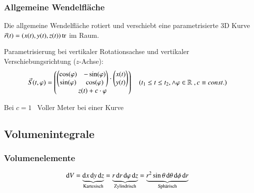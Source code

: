 

\subsubsection{Allgemeine Wendelfläche}
Die allgemeine Wendelfläche rotiert und verschiebt eine parametrisierte 3D Kurve $\vec{r}(t) = (x(t), y(t), z(t))\operatorname{tr}$ im Raum.

Parametrisierung bei vertikaler Rotationsachse und vertikaler Verschiebungsrichtung ($z$-Achse):
\[
    \vec{S}(t, \varphi) = \begin{pmatrix}
        \begin{pmatrix}
            \cos(\varphi) & -\sin(\varphi)\\
            \sin(\varphi) & \cos(\varphi)
        \end{pmatrix}
        \cdot \begin{pmatrix}
            x(t)\\
            y(t)
        \end{pmatrix}\\
        z(t) + c \cdot \varphi
    \end{pmatrix}
    \quad (t_1 \leq t \leq t_2, \land \varphi \in \mathbb{R}\;, c \equiv const.)
\]

Bei $c = 1$ \textrightarrow\ Voller Meter bei einer Kurve %



\subsection{Volumenintegrale}
\subsubsection{Volumenelemente}
$$ 
 \diff V 
    = \underbrace{\diff x \diff y \diff z}_{\text{Kartesisch}}
    = \underbrace{r \diff r \diff \varphi \diff z}_{\text{Zylindrisch}}
    = \underbrace{r^2 \sin \theta \diff \theta \diff \phi \diff r}_{\text{Sphärisch}}
$$


